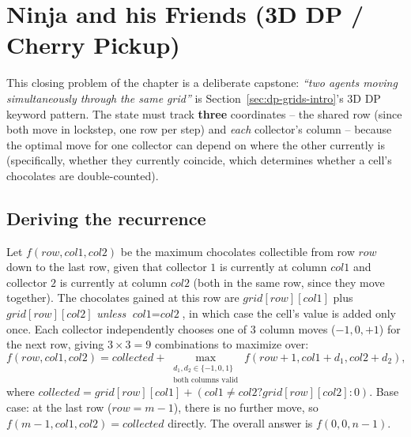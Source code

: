 \section{Ninja and his Friends (3D DP / Cherry Pickup)}
\label{sec:dp-ninja-friends}


\begin{patternbox}
This closing problem of the chapter is a deliberate capstone: \emph{``two
agents moving simultaneously through the same grid''} is
Section~\ref{sec:dp-grids-intro}'s 3D DP keyword pattern. The state must
track \textbf{three} coordinates -- the shared row (since both move in
lockstep, one row per step) and \emph{each} collector's column -- because
the optimal move for one collector can depend on where the other
currently is (specifically, whether they currently coincide, which
determines whether a cell's chocolates are double-counted).
\end{patternbox}

\subsection*{Deriving the recurrence}

Let $f(\textit{row}, \textit{col1}, \textit{col2})$ be the maximum
chocolates collectible from row $\textit{row}$ down to the last row,
given that collector $1$ is currently at column $\textit{col1}$ and
collector $2$ is currently at column $\textit{col2}$ (both in the same
row, since they move together). The chocolates gained at this row are
$\textit{grid}[\textit{row}][\textit{col1}]$ plus
$\textit{grid}[\textit{row}][\textit{col2}]$ \emph{unless}
$\textit{col1}=\textit{col2}$, in which case the cell's value is added
only once. Each collector independently chooses one of $3$ column
moves ($-1, 0, +1$) for the next row, giving $3 \times 3 = 9$
combinations to maximize over:
\[
  f(\textit{row}, \textit{col1}, \textit{col2}) = \textit{collected} +
  \max_{\substack{d_1, d_2 \in \{-1,0,1\} \\ \text{both columns valid}}}
  f(\textit{row}+1, \textit{col1}+d_1, \textit{col2}+d_2),
\]
where $\textit{collected} = \textit{grid}[\textit{row}][\textit{col1}] +
(\textit{col1} \ne \textit{col2} ? \textit{grid}[\textit{row}][\textit{col2}]
: 0)$. Base case: at the last row ($\textit{row}=m-1$), there is no
further move, so $f(m-1,\textit{col1},\textit{col2}) =
\textit{collected}$ directly. The overall answer is $f(0, 0, n-1)$.

